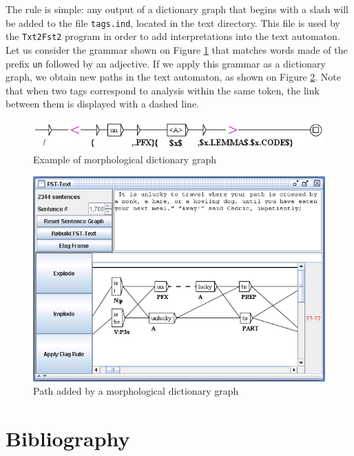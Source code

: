 \bigskip
\noindent The rule is simple: any output of a dictionary graph that begins
with a slash will be added to the file \verb+tags.ind+, 
located in the text directory. This file is used by the \verb+Txt2Fst2+ program
in order to add interpretations into the text automaton. Let us consider the
grammar shown on Figure \ref{morphoA} that matches words made of the prefix
\verb+un+ followed by an adjective. If we apply this grammar as a dictionary
graph, we obtain new paths in the text automaton, as shown on Figure
\ref{morphoB}. Note that when two tags correspond to analysis within the same
token, the link between them is displayed with a dashed line.

\begin{figure}[!ht]
\begin{center}
\includegraphics[width=14cm]{resources/img/fig3-12a.png}
\caption{Example of morphological dictionary graph\label{morphoA}}
\end{center}
\end{figure}

\begin{figure}[!ht]
\begin{center}
\includegraphics[width=15cm]{resources/img/fig3-12b.png}
\caption{Path added by a morphological dictionary
graph\label{morphoB}}
\end{center}
\end{figure}


\section{Bibliography}


